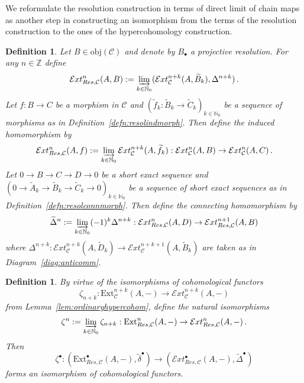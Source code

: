 \documentclass[12pt,a4paper]{article}
\numberwithin{equation}{section}
\newtheorem{defn}[thm]{Definition}
\theoremstyle{nonumberplain}
\begin{document}
We reformulate the resolution construction in terms of direct limit of chain maps as another step in constructing an isomorphism from the terms of the resolution construction to the ones of the hypercohomology construction.

\begin{defn}
Let $B \in \mathrm{obj}(\mathcal{C})$ and denote by $B_{\bullet}$ a projective resolution. For any $n \in \mathbb{Z}$ define
\[ \mathcal{E}xt_{Res, \mathcal{C}}^n(A, B) := \varinjlim_{k \in \mathbb{N}_0} (\mathcal{E}xt_{\mathcal{C}}^{n+k}(A, \widetilde{B}_k), \Delta^{n+k}) \, . \]
Let $f: B \rightarrow C$ be a morphism in $\mathcal{C}$ and $(\widetilde{f}_k: \widetilde{B}_k \rightarrow \widetilde{C}_k)_{k \in \mathbb{N}_0}$ be a sequence of morphisms as in Definition~\ref{defn:resolindmorph}. Then define the induced homomorphism by
\[ \mathcal{E}xt_{Res, \mathcal{C}}^n(A, f) := \varinjlim_{k \in \mathbb{N}_0} \mathcal{E}xt_{\mathcal{C}}^{n+k}(A, \widetilde{f}_k): \mathcal{E}xt_{\mathcal{C}}^n(A, B) \rightarrow \mathcal{E}xt_{\mathcal{C}}^n(A, C) \, . \]
Let $0 \rightarrow B \rightarrow C \rightarrow D \rightarrow 0$ be a short exact sequence and $(0 \rightarrow \widetilde{A}_k \rightarrow \widetilde{B}_k \rightarrow \widetilde{C}_k \rightarrow 0)_{k \in \mathbb{N}_0}$ be a sequence of short exact sequences as in Definition~\ref{defn:resolconnmorph}. Then define the connecting homomorphism by
\[ \widetilde{\Delta}^n := \varinjlim_{k \in \mathbb{N}_0} (-1)^k \Delta^{n+k}: \mathcal{E}xt_{Res, \mathcal{C}}^n(A, D) \rightarrow \mathcal{E}xt_{Res, \mathcal{C}}^{n+1}(A, B) \]
where $\Delta^{n+k}: \mathcal{E}xt_{\mathcal{C}}^{n+k}(A, \widetilde{D}_k) \rightarrow \mathcal{E}xt_{\mathcal{C}}^{n+k+1}(A, \widetilde{B}_k)$ are taken as in Diagram~\ref{diag:anticomm}.
\end{defn}

\begin{defn}\label{defn:resolinchains}
By virtue of the isomorphisms of cohomological functors 
\[ \zeta_{n+k}: \mathrm{Ext}_{\mathcal{C}}^{n+k}(A, -) \rightarrow \mathcal{E}xt_{\mathcal{C}}^{n+k}(A, -) \]
from Lemma~\ref{lem:ordinaryhypercohom}, define the natural isomorphisms
\[ \zeta^n := \varinjlim_{k \in \mathbb{N}_0} \zeta_{n+k}: \mathrm{Ext}_{Res, \mathcal{C}}^n(A, -) \rightarrow \mathcal{E}xt_{Res, \mathcal{C}}^n(A, -) \, . \]
Then
\[ \zeta^{\bullet}: (\mathrm{Ext}_{Res, \mathcal{C}}^{\bullet}(A, -), \widetilde{\delta}^{\bullet}) \rightarrow (\mathcal{E}xt_{Res, \mathcal{C}}^{\bullet}(A, -), \widetilde{\Delta}^{\bullet}) \]
forms an isomorphism of cohomological functors.
\end{defn}
\end{document}
